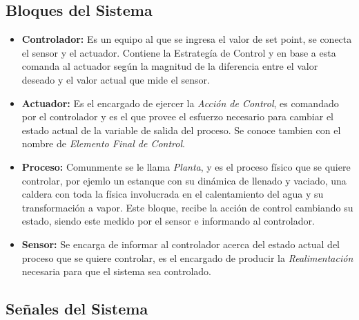 \documentclass[letterpaper, 10pt]{report}
\begin{document}
	\subsection{Bloques del Sistema}	
	
	\begin{itemize}
	\item {\bf Controlador: }
	Es un equipo al que se ingresa el valor de set point, se conecta el sensor y el actuador. Contiene la Estrategía de Control y en base a esta comanda al actuador según la magnitud de la diferencia entre el valor deseado y el valor actual que mide el sensor.
	
	\item {\bf Actuador: }
	Es el encargado de ejercer la  \emph{Acción de Control}, es comandado por el controlador y es el que provee el esfuerzo necesario para cambiar el estado actual de la variable de salida del proceso. Se conoce tambien con el nombre de \emph{Elemento Final de Control}.
	
	\item {\bf Proceso: }
	Comunmente se le llama \emph{Planta}, y es el proceso físico que se quiere controlar, por ejemlo un estanque con su dinámica de llenado y vaciado, una caldera con toda la física involucrada en el calentamiento del agua y su transformación a vapor. Este bloque, recibe la acción de control cambiando su estado, siendo este medido por el sensor e informando al controlador.
	
	\item {\bf Sensor: }
	Se encarga de informar al controlador acerca del estado actual del proceso que se quiere controlar, es el encargado de producir la \emph{Realimentación} necesaria para que el sistema sea controlado.
	\end{itemize}
	
	\subsection{Señales del Sistema}
	
\end{document}
